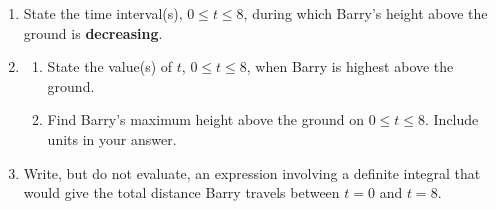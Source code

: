 \documentclass{article}
\begin{document}
\begin{enumerate}
\begin{problem}
\begin{center}
    \end{center}

    \end{problem}
    
    \begin{enumerate}
        \item 
        \begin{problem}
            State the time interval(s), $0\leq t\leq 8$, during which Barry's height above the ground is \textbf{decreasing}.
        \end{problem}

        \item 
        \begin{enumerate}
            \item 
            \begin{problem}
                State the value(s) of $t$, $0\leq t \leq 8$, when Barry is highest above the ground.
            \end{problem}

            \item
            \begin{problem}
            Find Barry's maximum height above the ground on $0\leq t \leq8$. Include units in your answer.
            \end{problem}
        \end{enumerate}


        \item
        \begin{problem}
            Write, but do not evaluate, an expression involving a definite integral that would give the total distance Barry travels between $t=0$ and $t=8$.
        \end{problem}

\end{enumerate}

\pspace{\newpage}
        
\end{enumerate}
\end{document}
